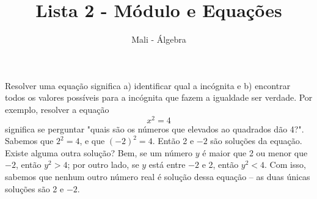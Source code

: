 \documentclass{article}
\title{Lista 2 - Módulo e Equações}
\author{Mali - Álgebra}
\begin{document}
\maketitle

Resolver uma equação significa a) identificar qual a incógnita e b) encontrar todos os valores possíveis para a incógnita que fazem a igualdade ser verdade.
Por exemplo, resolver a equação 
\begin{equation}
	x^2 = 4
\end{equation}
significa se perguntar "quais são os números que elevados ao quadrados dão 4?". Sabemos que $2^2 = 4$, e que $(-2)^2 = 4$. Então 2 e $-2$ são soluções da equação.
Existe alguma outra solução? Bem, se um número $y$ é maior que 2 ou menor que $-2$, então $y^2 > 4$; por outro lado, se $y$ está entre $-2$ e 2, então $y^2 < 4$. Com
isso, sabemos que nenhum outro número real é solução dessa equação -- as duas únicas soluções são 2 e $-2$.
\end{document}
